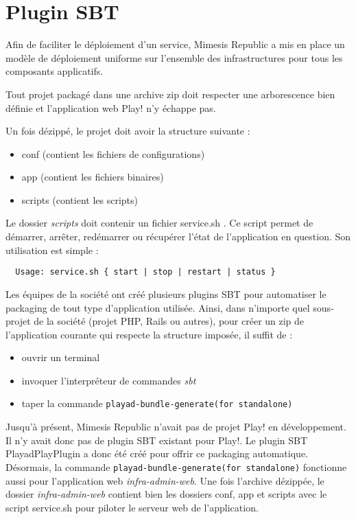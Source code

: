 \clearpage
\section{Plugin SBT}

Afin de faciliter le déploiement d'un service, Mimesis Republic a mis en place
un modèle de déploiement uniforme sur l'ensemble des infrastructures pour tous
les composants applicatifs.

Tout projet packagé dans une archive zip doit respecter une arborescence bien
définie et l'application web Play! n'y échappe pas.

Un fois dézippé, le projet doit avoir la structure suivante :
\begin{itemize}
\item[\textbullet] conf    (contient les fichiers de configurations)
\item[\textbullet] app     (contient les fichiers binaires)
\item[\textbullet] scripts (contient les scripts)
\end{itemize}

Le dossier \textit{scripts} doit contenir un fichier service.sh .
Ce script permet de démarrer, arrêter, redémarrer ou récupérer l'état de
l'application en question.
Son utilisation est simple :
\begin{lstlisting}
  Usage: service.sh { start | stop | restart | status }  
\end{lstlisting}

Les équipes de la société ont créé plusieurs plugins SBT pour automatiser le
packaging de tout type d'application utilisée.
Ainsi, dans n'importe quel sous-projet de la société (projet PHP, Rails ou
autres), pour créer un zip de l'application courante qui respecte la
structure imposée, il suffit de :
\begin{itemize}
\item ouvrir un terminal
\item invoquer l'interpréteur de commandes \textit{sbt}
\item taper la commande \verb?playad-bundle-generate(for standalone)? \\
\end{itemize}

Jusqu'à présent, Mimesis Republic n'avait pas de projet Play! en développement.
Il n'y avait donc pas de plugin SBT existant pour Play!. 
Le plugin SBT PlayadPlayPlugin a donc été créé pour offrir ce packaging 
automatique.
Désormais, la commande \verb?playad-bundle-generate(for standalone)? fonctionne
aussi pour l'application web \textit{infra-admin-web}.
Une fois l'archive dézippée, le dossier \textit{infra-admin-web} contient bien
les dossiers conf, app et scripts avec le script service.sh pour piloter le
serveur web de l'application.

